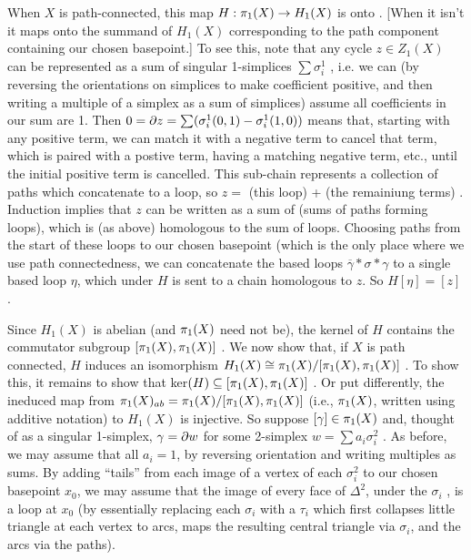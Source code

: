 When $X$ is path-connected, this map $H:\pi_1(X)\rightarrow H_1(X)$ is onto . [When it isn't it maps onto the 
summand of $H_1(X)$ corresponding to the path component containing our chosen basepoint.]
To see this, note that any cycle $z\in Z_1(X)$ can be represented as a sum of singular
1-simplices $\sum \sigma_i^1$ , i.e. we can (by reversing the orientations on simplices
to make coefficient positive, and then writing a multiple of a simplex as a sum of
simplices) assume all coefficients in our sum are 1. Then 
$0 = \partial z = \sum (\sigma_i^1(0,1) - \sigma_i^1(1,0))$ means that, starting with any positive term, 
we can match it with a 
negative term to cancel that term, which is paired with a postive term, having a matching negative term, etc.,
until the initial positive term is cancelled. This sub-chain represents a collection of paths which 
concatenate to a loop, so $z=$ (this loop) + (the remainiung terms) . Induction implies that
$z$ can be written as a sum of (sums of paths forming loops), which is (as above) homologous  to the
sum of loops. Choosing paths from the start of these loops to our chosen basepoint (which is the only
place where we use path connectedness, we can concatenate the based loops $\overline{\gamma}*\sigma*\gamma$
to a single based loop $\eta$, which under $H$ is sent to a chain homologous to $z$.
So $H[\eta] = [z]$ .

\msk 

Since $H_1(X)$ is abelian (and $\pi_1(X)$ need not be), the kernel of $H$ contains the
commutator subgroup $[\pi_1(X),\pi_1(X)]$ . 
We now show that, if $X$ is path connected,
$H$ induces an isomorphism $H_1(X) \cong \pi_1(X)/[\pi_1(X),\pi_1(X)]$ . 
To show this, it remains to show that  ker$(H)\subseteq [\pi_1(X),\pi_1(X)]$ . 
Or put differently, the ineduced map from $\pi_1(X)_{ab} = \pi_1(X)/[\pi_1(X),\pi_1(X)]$ 
(i.e., $\pi_1(X)$, written using additive notation) to $H_1(X)$  is injective.
So suppose $[\gamma]\in \pi_1(X)$ and, thought of as a singular 1-simplex, 
$\gamma = \partial w$ for some 2-simplex $w=\sum a_i\sigma_i^2$ . 
As before, we may assume that all $a_i=1$, by reversing orientation and writing multiples as 
sums. By adding ``tails'' from each image of a vertex of each $\sigma_i^2$ to our chosen 
basepoint $x_0$, we may assume that the image of every face of $\Delta^2$, under
the $\sigma_i$ , is a loop at $x_0$ (by essentially replacing each $\sigma_i$ with a $\tau_i$
which first collapses little triangle at each vertex to arcs, maps the resulting central triangle
via $\sigma_i$, and the arcs via the paths). 

\ssk


